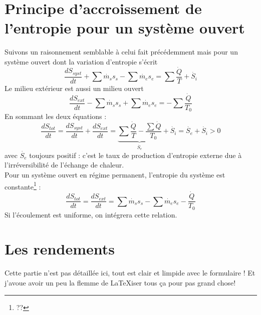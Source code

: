 	\section{Principe d’accroissement de l’entropie pour un système ouvert}
	Suivons un raisonnement semblable à celui fait précédemment mais pour un système 
	ouvert dont la variation d'entropie s'écrit
	\begin{equation}
	\dfrac{dS_{syst}}{dt}+\sum \dot{m_s}s_s - \sum \dot{m_e}s_e = \sum\dfrac{\dot{Q}}{T}+\dot{S_i}
	\end{equation}
	Le milieu extérieur est aussi un milieu ouvert 
	\begin{equation}
	\dfrac{dS_{ext}}{dt}-\sum \dot{m_s}s_s + \sum \dot{m_e}s_e = -\sum\dfrac{\dot{Q}}{T_0}
	\end{equation}
	En sommant les deux équations :
	\begin{equation}
	\dfrac{dS_{tot}}{dt} = \dfrac{dS_{syst}}{dt}+\dfrac{dS_{ext}}{dt} = \underbrace{
	\sum\dfrac{\dot{Q}}{T}-\dfrac{\sum \dot{Q}}{T_0}}_{\dot{S_e}} + \dot{S_i} = \dot{S_e}
	+\dot{S_i} > 0
	\end{equation}
	avec $\dot{S_e}$ toujours positif : c'est le taux de production d'entropie externe due 
	à l'irréversibilité de l'échange de chaleur.\\
	Pour un système ouvert en régime permanent, l’entropie du système est constante\footnote{??} :
	\begin{equation}
	\dfrac{dS_{tot}}{dt} = \dfrac{dS_{ext}}{dt} = \sum\dot{m_s}s_s-\sum\dot{m_e}s_e - 
	\dfrac{\dot{Q}}{T_0}
	\end{equation}
	Si l'écoulement est uniforme, on intégrera cette relation.
	
	\section{Les rendements}
	Cette partie n'est pas détaillée ici, tout est clair et limpide avec le formulaire ! Et 
	j'avoue avoir un peu la flemme de \LaTeX iser tous ça pour pas grand chose!
	
	
	
